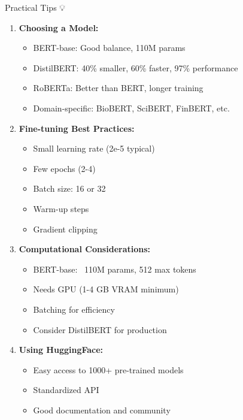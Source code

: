 \documentclass[aspectratio=169]{beamer}
\begin{document}
\begin{frame}[shrink=10]{Practical Tips 💡}
\begin{enumerate}\setlength{\itemsep}{0pt}
    \item \textbf{Choosing a Model:}
    \begin{itemize}\setlength{\itemsep}{0pt}
        \item BERT-base: Good balance, 110M params
        \item DistilBERT: 40\% smaller, 60\% faster, 97\% performance
        \item RoBERTa: Better than BERT, longer training
        \item Domain-specific: BioBERT, SciBERT, FinBERT, etc.
    \end{itemize}

    \item \textbf{Fine-tuning Best Practices:}
    \begin{itemize}\setlength{\itemsep}{0pt}
        \item Small learning rate (2e-5 typical)
        \item Few epochs (2-4)
        \item Batch size: 16 or 32
        \item Warm-up steps
        \item Gradient clipping
    \end{itemize}

    \item \textbf{Computational Considerations:}
    \begin{itemize}\setlength{\itemsep}{0pt}
        \item BERT-base: ~110M params, 512 max tokens
        \item Needs GPU (1-4 GB VRAM minimum)
        \item Batching for efficiency
        \item Consider DistilBERT for production
    \end{itemize}

    \item \textbf{Using HuggingFace:}
    \begin{itemize}\setlength{\itemsep}{0pt}
        \item Easy access to 1000+ pre-trained models
        \item Standardized API
        \item Good documentation and community
    \end{itemize}
\end{enumerate}
\end{frame}
\end{document}
